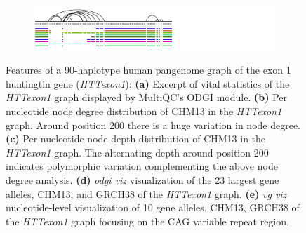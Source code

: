 \begin{figure}[]
\begin{subfigure}{\linewidth}
        \label{fig:metrics-viz}
    \end{subfigure}
    \begin{subfigure}{\linewidth}
        \caption{}
        \centering
        \includegraphics[width=1.0\linewidth, trim=-0.4cm 0.4cm 3.15cm 0cm]{fig/metrics/chr4_pan_HTTex1_STR_xg_svg}
        \label{fig:metrics-str}
        \vspace{-0.5em}
    \end{subfigure}
	\caption{Features of a 90-haplotype human pangenome graph of the exon 1 huntingtin gene (\textit{HTTexon1}): \textbf{(a)} Excerpt of vital statistics of the \textit{HTTexon1} graph displayed by MultiQC's ODGI module. \textbf{(b)} Per nucleotide node degree distribution of CHM13 in the \textit{HTTexon1} graph. Around position 200 there is a huge variation in node degree. \textbf{(c)} Per nucleotide node depth distribution of CHM13 in the \textit{HTTexon1} graph. The alternating depth around position 200 indicates polymorphic variation complementing the above node degree analysis. \textbf{(d)} \textit{odgi viz} visualization of the 23 largest gene alleles, CHM13, and GRCH38 of the \textit{HTTexon1} graph. \textbf{(e)} \textit{vg viz} nucleotide-level visualization of 10 gene alleles, CHM13, GRCH38 of the \textit{HTTexon1} graph focusing on the CAG variable repeat region.}
	\label{fig:metrics}
\end{figure}
